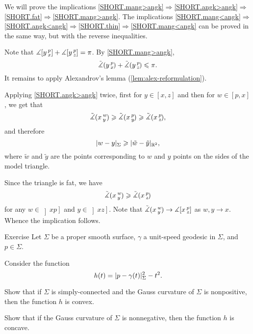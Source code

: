 We will prove the implications \ref{SHORT.mang>angk}$\Rightarrow$\ref{SHORT.angk>angk}$\Rightarrow$\ref{SHORT.fat}$\Rightarrow$\ref{SHORT.mang>angk}.
The implications \ref{SHORT.mang<angk}$\Rightarrow$\ref{SHORT.angk<angk}$\Rightarrow$\ref{SHORT.thin}$\Rightarrow$\ref{SHORT.mang<angk} can be proved in the same way, but with the reverse inequalities.

Note that $\measuredangle[y\,{}^{p}_{x}]+\measuredangle[y\,{}^{p}_{z}]=\pi$.
By \ref{SHORT.mang>angk}, 
\[\tilde\measuredangle(y\,{}^{p}_{x}\hspace{-0.2ex})+\tilde\measuredangle(y\,{}^{p}_{z}\hspace{-0.2ex})\leqslant \pi.\]
It remains to apply Alexandrov's lemma (\ref{lem:alex-reformulation}).

Applying \ref{SHORT.angk>angk} twice, first for $y\in [x,z]$ and then for $w\in [p,x]$, we get that
\[\tilde\measuredangle(x\,{}^{w}_{y}\hspace{-0.2ex}) \geqslant \tilde\measuredangle(x\,{}^{p}_{y}\hspace{-0.2ex}) \geqslant \tilde\measuredangle(x\,{}^{p}_{z}\hspace{-0.2ex}),\]
and therefore
\[\dist{w}{y}\Sigma\ge \dist{\tilde w}{\tilde y}{\mathbb{R}^2},\]
where $\tilde w$ and $\tilde y$ are the points corresponding to $w$ and $y$ points on the sides of the model triangle. 

Since the triangle is fat, we have 
\[\tilde\measuredangle(x\,{}^{w}_{y}\hspace{-0.2ex}) \geqslant \tilde\measuredangle(x\,{}^{p}_{z}\hspace{-0.2ex})\]
for any $w\in \left]xp\right]$ and $y\in \left]xz\right]$.
Note that $\tilde\measuredangle(x\,{}^{w}_{y}\hspace{-0.2ex})\to \measuredangle[x\,{}^{p}_{z}]$ as $w,y\to x$.
Whence the implication follows.
\qeds

\begin{thm}{Exercise}\label{ex:geod-convexity}
Let $\Sigma$ be a proper smooth surface, 
 $\gamma$ a unit-speed geodesic in $\Sigma$, and $p\in\Sigma$.

Consider the function
\[h(t)=\dist{p}{\gamma(t)}\Sigma^2-t^2.\]

\begin{subthm}{}
Show that if $\Sigma$ is simply-connected and the Gauss curvature of $\Sigma$ is nonpositive, then the function $h$ is convex.
\end{subthm}

\begin{subthm}{} Show that if the Gauss curvature of $\Sigma$ is nonnegative, then the function $h$ is concave.
\end{subthm}

\end{thm}

